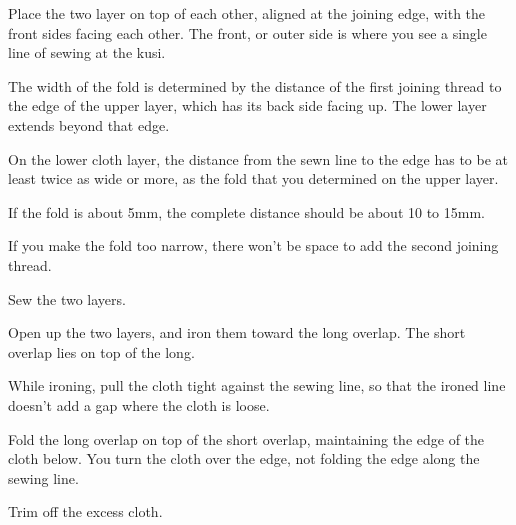 Place the two layer on top of each other, aligned at the joining edge,
with the front sides facing each other. The front, or outer side is
where you see a single line of sewing at the kusi.



The width of the fold is determined by the distance of the first joining
thread to the edge of the upper layer, which has its back side facing
up. The lower layer extends beyond that edge.

On the lower cloth layer, the distance from the sewn line to the edge
has to be at least twice as wide or more, as the fold that you
determined on the upper layer.

If the fold is about 5mm, the complete distance should be about 10 to
15mm.

If you make the fold too narrow, there won't be space to add the second
joining thread.

Sew the two layers.



\clearpage

Open up the two layers, and iron them toward the long overlap. The short
overlap lies on top of the long.



While ironing, pull the cloth tight against the sewing line, so that the
ironed line doesn't add a gap where the cloth is loose.


Fold the long overlap on top of the short overlap, maintaining the edge
of the cloth below. You turn the cloth over the edge, not folding the
edge along the sewing line.


\clearpage

Trim off the excess cloth.

\begin{multicols}{2}
\setlength{\nextPhotoWidth}{\linewidth}


\columnbreak
\setlength{\nextPhotoWidth}{\linewidth}


\end{multicols}


